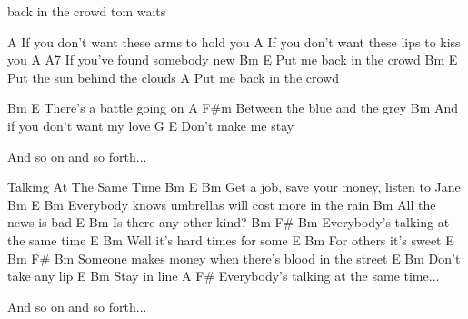 back in the crowd
tom waits


A
If you don’t want these arms to hold you
A
If you don’t want these lips to kiss you
A                            A7
If you’ve found somebody new
Bm                 E
Put me back in the crowd
Bm                     E
Put the sun behind the clouds
                   A
Put me back in the crowd


Bm               E
There’s a battle going on
           A             F#m
Between the blue and the grey
Bm
And if you don’t want my love
G                       E
Don’t make me stay


And so on and so forth...





Talking At The Same Time
Bm                          E         Bm
Get a job, save your money, listen to Jane
Bm                             E                Bm   
Everybody knows umbrellas will cost more in the rain
Bm                 
All the news is bad
E                  Bm
Is there any other kind?
Bm                         F#    Bm
Everybody’s talking at the same time
          E              Bm       
Well it’s hard times for some
E               Bm
For others it’s sweet
E             Bm                 F#            Bm      
Someone makes money when there’s blood in the street
E              Bm  
Don’t take any lip
E       Bm
Stay in line
A                          F#        
Everybody’s talking at the same time...

And so on and so forth...
